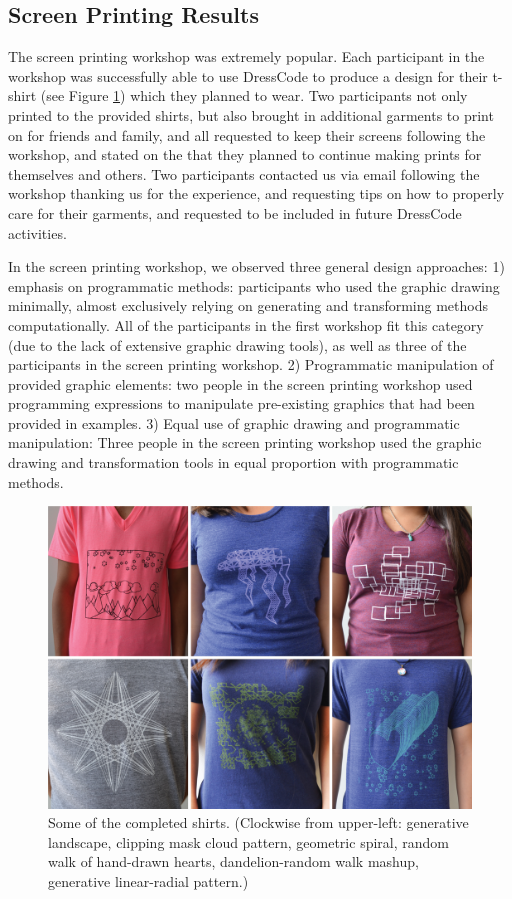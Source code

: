 \documentclass{sigchi}
\begin{document}
\subsection{Screen Printing Results}
The screen printing workshop was extremely popular. Each participant in the workshop was successfully able to use DressCode to produce a design for their t-shirt (see Figure \ref{fig:screen_results}) which they planned to wear. Two participants not only printed to the provided shirts, but also brought in additional garments to print on for friends and family, and all requested to keep their screens following the workshop, and stated on the that they planned to continue making prints for themselves and others. Two participants contacted us via email following the workshop thanking us for the experience, and requesting tips on how to properly care for their garments, and requested to be included in future DressCode activities. 

In the screen printing workshop, we observed three general design approaches: 1) emphasis on programmatic methods: participants who used the graphic drawing minimally, almost exclusively relying on generating and transforming methods computationally. All of the participants in the first workshop fit this category (due to the lack of extensive graphic drawing tools), as well as three of the participants in the screen printing workshop. 2) Programmatic manipulation of provided graphic elements: two people in the screen printing workshop used programming expressions to manipulate pre-existing graphics that had been provided in examples. 3) Equal use of graphic drawing and programmatic manipulation: Three people in the screen printing workshop used the graphic drawing and transformation tools in equal proportion with programmatic methods.

\begin{center}
\begin{figure}[h!]
\includegraphics[width=\columnwidth]{images/shirt_results.jpg}
\caption{Some of the completed shirts. (Clockwise from upper-left: generative landscape, clipping mask cloud pattern, geometric spiral, random walk of hand-drawn hearts, dandelion-random walk mashup, generative linear-radial pattern.) }
\label{fig:screen_results}
\end{figure}
\end{center}
\vspace{-20pt}
\end{document}
